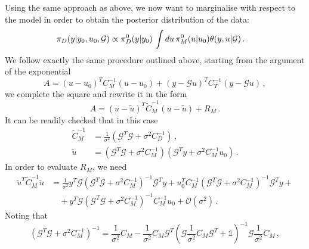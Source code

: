 Using the same approach as above, we now want to marginalise with respect to the model in order to obtain the posterior distribution of the data: 
\begin{align}
    \label{eq:MarginGaussModel}
    \pi_D(y|y_0,u_0,\mathcal{G}) 
    &\propto \pi_{D}^0(y|y_0) \, 
    \int du\, \pi_{M}^0(u|u_0) 
      \theta(y,u|\mathcal{G}) \, .
  \end{align}
We follow exactly the same procedure outlined above, starting from the argument
of the exponential
\begin{equation}
    \label{eq:QuadFormModelInt}
    A = \left(u-u_0\right)^T C_M^{-1} \left(u-u_0\right) +
    \left(y-\mathcal{G}u\right)^T C_T^{-1} \left(y-\mathcal{G}u\right)\, ,
\end{equation}
we complete the square and rewrite it in the form
\begin{equation}
    \label{eq:QuadFormModelIntSquare}
    A = \left(u-\tilde{u}\right)^T 
    \tilde{C}_M^{-1}
    \left(u-\tilde{u}\right) + R_M\, .
\end{equation}
It can be readily checked that in this case
\begin{align}
    \tilde{C}_M^{-1} &= \frac{1}{\sigma^2}
    \left(\mathcal{G}^T \mathcal{G} + \sigma^2 C_D^{-1}\right)\, , \\
    \tilde{u} &= \left(\mathcal{G}^T \mathcal{G} + \sigma^2 C_M^{-1}\right)
    \left(
        \mathcal{G}^T y + \sigma^2 C_M^{-1} u_0
    \right)\, .
\end{align}
In order to evaluate $R_M$, we need
\begin{equation}
    \label{eq:UtildeUtildeTerm}
    \begin{split}
    \tilde{u}^T \tilde{C}_M^{-1} \tilde{u} 
    &= \frac{1}{\sigma^2} y^T \mathcal{G} 
    \left(\mathcal{G}^T \mathcal{G} + \sigma^2 C_M^{-1}\right)^{-1}
    \mathcal{G}^T y +
    u_0^T C_M^{-1} 
    \left(\mathcal{G}^T \mathcal{G} + \sigma^2 C_M^{-1}\right)^{-1}
    \mathcal{G}^T y + \\
    & \quad + y^T \mathcal{G} \left(\mathcal{G}^T \mathcal{G} + \sigma^2 C_M^{-1}\right)^{-1} C_M^{-1} u_0 + \mathcal{O}(\sigma^2)\, .
    \end{split} 
\end{equation}
Noting that
\begin{equation}
    \label{eq:InverseFromTarantola}
    \left(\mathcal{G}^T \mathcal{G} + \sigma^2 C_M^{-1}\right)^{-1} =
    \frac{1}{\sigma^2} C_M - 
    \frac{1}{\sigma^2} C_M \mathcal{G}^T 
    \left(\mathcal{G} \frac{1}{\sigma^2} C_M \mathcal{G}^T 
        + \mathds{1}\right)^{-1} \mathcal{G}
    \frac{1}{\sigma^2} C_M\, ,
\end{equation}
